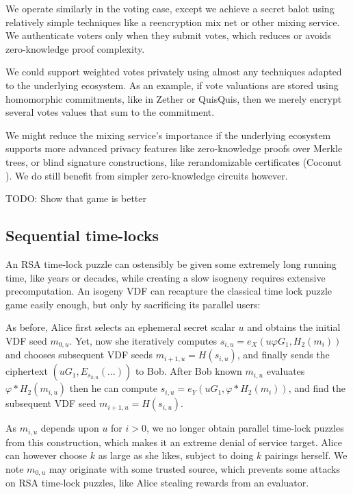 \documentclass{article}
\begin{document}
We operate similarly in the voting case, except we achieve a secret
balot using relatively simple techniques like a reencryption mix net
or other mixing service.  We authenticate voters only when they submit
votes, which reduces or avoids zero-knowledge proof complexity.

We could support weighted votes privately using almost any techniques
adapted to the underlying ecosystem.  As an example, if vote valuations
are stored using homomorphic commitments, like in Zether or QuisQuis,
then we merely encrypt several votes values that sum to the commitment.

We might reduce the mixing service's importance if the underlying
ecosystem supports more advanced privacy features like zero-knowledge
proofs over Merkle trees, or blind signature constructions, like
rerandomizable certificates (Coconut \cite{Coconut}).
We do still benefit from simpler zero-knowledge circuits however.


TODO: Show that game is better

\subsection{Sequential time-locks}

An RSA time-lock puzzle can ostensibly be given some extremely long
running time, like years or decades, while creating a slow isogneny
requires extensive precomputation.  An isogeny VDF can recapture the
classical time lock puzzle game easily enough, but only by sacrificing
its parallel users:

As before, Alice first selects an ephemeral secret scalar $u$ and
obtains the initial VDF seed $m_{0,u}$.  Yet, now she iteratively
computes $s_{i,u} = e_X ( u φ G_1, H_2(m_i) )$ and chooses subsequent
VDF seeds $m_{i+1,u} = H(s_{i,u})$, and finally sends the ciphertext
$(u G_1, E_{s_{k,u}}(\ldots))$ to Bob.
After Bob known $m_{i,u}$ evaluates $φ* H_2(m_{i,u})$ then he can
compute $s_{i,u} = e_Y ( u G_1, φ* H_2(m_i) )$, and find the subsequent
VDF seed $m_{i+1,u} = H(s_{i,u})$.

As $m_{i,u}$ depends upon $u$ for $i>0$, we no longer obtain parallel
time-lock puzzles from this construction, which makes it an extreme
denial of service target.  Alice can however choose $k$ as large as
she likes, subject to doing $k$ pairings herself.
We note $m_{0,u}$ may originate with some trusted source, which
prevents some attacks on RSA time-lock puzzles, like Alice stealing
rewards from an evaluator.
\end{document}
